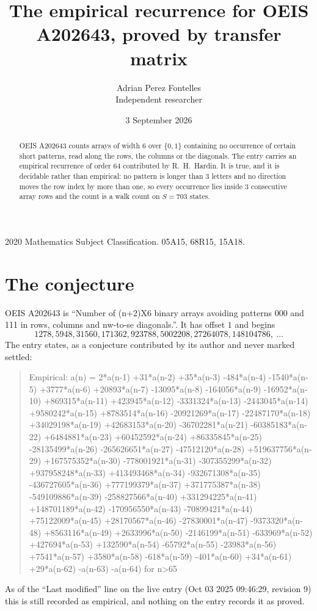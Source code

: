 \documentclass[11pt,a4paper]{article}
\title{The empirical recurrence for OEIS A202643, proved by transfer matrix}
\author{Adrian Perez Fontelles\\ \small Independent researcher}
\date{3 September 2026}
\theoremstyle{plain}
\theoremstyle{definition}
\begin{document}
\maketitle

\begin{abstract}
OEIS A202643 counts arrays of width $6$ over $\{0,1\}$ containing no occurrence of certain short
patterns, read along the rows, the columns or the diagonals. The entry carries an empirical
recurrence of order $64$ contributed by R.~H.~Hardin. It is true, and it is decidable
rather than empirical: no pattern is longer than $3$ letters and no direction moves the row
index by more than one, so every occurrence lies inside $3$ consecutive array rows and the
count is a walk count on $S=703$ states.
\end{abstract}

\noindent\small 2020 Mathematics Subject Classification. 05A15, 68R15, 15A18.\normalsize

\section{The conjecture}

OEIS A202643 is ``Number of (n+2)X6 binary arrays avoiding patterns 000 and 111 in rows, columns and nw-to-se diagonals.''. It has offset $1$ and begins
\[
1278, 5948, 31560, 171362, 923788, 5002208, 27264078, 148104786,\ \dots
\]
The entry states, as a conjecture contributed by its author and never marked settled:
\begin{quote}
Empirical: a(n) = 2*a(n-1) +31*a(n-2) +35*a(n-3) -484*a(n-4) -1540*a(n-5) +3777*a(n-6) +20893*a(n-7) -13095*a(n-8) -164056*a(n-9) -16952*a(n-10) +869315*a(n-11) +423945*a(n-12) -3331324*a(n-13) -2443045*a(n-14) +9580242*a(n-15) +8783514*a(n-16) -20921269*a(n-17) -22487170*a(n-18) +34029198*a(n-19) +42683153*a(n-20) -36702281*a(n-21) -60385183*a(n-22) +6484881*a(n-23) +60452592*a(n-24) +86335845*a(n-25) -28135499*a(n-26) -265626651*a(n-27) -47512120*a(n-28) +519637756*a(n-29) +167575352*a(n-30) -778001921*a(n-31) -307355299*a(n-32) +937958248*a(n-33) +413493468*a(n-34) -932671308*a(n-35) -436727605*a(n-36) +777199379*a(n-37) +371775387*a(n-38) -549109886*a(n-39) -258827566*a(n-40) +331294225*a(n-41) +148701189*a(n-42) -170956550*a(n-43) -70899421*a(n-44) +75122009*a(n-45) +28170567*a(n-46) -27830001*a(n-47) -9373320*a(n-48) +8563116*a(n-49) +2633996*a(n-50) -2146199*a(n-51) -633969*a(n-52) +427694*a(n-53) +132590*a(n-54) -65792*a(n-55) -23983*a(n-56) +7541*a(n-57) +3580*a(n-58) -618*a(n-59) -401*a(n-60) +34*a(n-61) +29*a(n-62) -a(n-63) -a(n-64) for n>65
\end{quote}
As of the ``Last modified'' line on the live entry (Oct 03 2025 09:46:29, revision 9) this is still
recorded as empirical, and nothing on the entry records it as proved.
\end{document}
